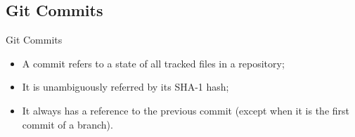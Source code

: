 \documentclass{beamer}
\begin{document}
\subsection{Git Commits}
\begin{frame}{Git Commits}
  \begin{itemize}
    \item A commit refers to a state of all tracked files in a repository;
    \item It is unambiguously referred by its SHA-1 hash;
    \item It always has a reference to the previous commit (except when it is the first commit of a branch).
  \end{itemize}
  \begin{scriptsize}
    
  \end{scriptsize}
\end{frame}
\end{document}
